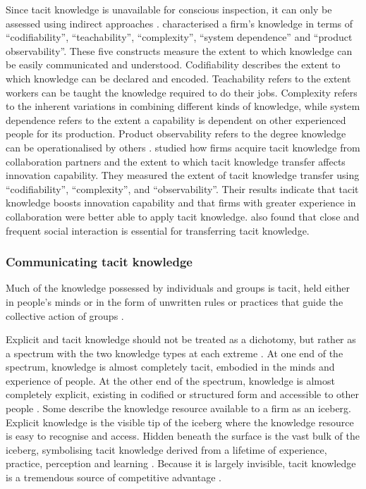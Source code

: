 Since tacit knowledge is unavailable for conscious inspection, it can only be assessed using indirect approaches \citep{chilton2007dimensions}. \citet{zander1995knowledge} characterised a firm's knowledge in terms of \enquote{codifiability}, \enquote{teachability}, \enquote{complexity}, \enquote{system dependence} and \enquote{product observability}. These five constructs measure the extent to which knowledge can be easily communicated and understood. Codifiability describes the extent to which knowledge can be declared and encoded. Teachability refers to the extent workers can be taught the knowledge required to do their jobs. Complexity refers to the inherent variations in combining different kinds of knowledge, while system dependence refers to the extent a capability is dependent on other experienced people for its production. Product observability refers to the degree knowledge can be operationalised by others \citep{winter1987knowledge,zander1995knowledge}. \citet{cavusgil2003tacit} studied how firms acquire tacit knowledge from collaboration partners and the extent to which tacit knowledge transfer affects innovation capability. They measured the extent of tacit knowledge transfer using \enquote{codifiability}, \enquote{complexity}, and \enquote{observability}. Their results indicate that tacit knowledge boosts innovation capability and that firms with greater experience in collaboration were better able to apply tacit knowledge. \citet{cavusgil2003tacit} also found that close and frequent social interaction is essential for transferring tacit knowledge.\medskip

\subsubsection{Communicating tacit knowledge}

Much of the knowledge possessed by individuals and groups is tacit, held either in people's minds or in the form of unwritten rules or practices that guide the collective action of groups \citep{mowery1996strategic,leonard1998role,burt2007secondhand,goksel2016can,lichtenthaler2016absorptive}. \medskip

Explicit and tacit knowledge should not be treated as a dichotomy, but rather as a spectrum with the two knowledge types at each extreme \citep{polanyi1966tacit,inkpen1998knowledge,cavusgil2003tacit}. At one end of the spectrum, knowledge is almost completely tacit, embodied in the minds and experience of people. At the other end of the spectrum, knowledge is almost completely explicit, existing in codified or structured form and accessible to other people \citep{leonard1998role}. Some describe the knowledge resource available to a firm as an iceberg. Explicit knowledge is the visible tip of the iceberg where the knowledge resource is easy to recognise and access. Hidden beneath the surface is the vast bulk of the iceberg, symbolising tacit knowledge derived from a lifetime of experience, practice, perception and learning \citep{haldin2000difficulties,mcadam2007exploring,rebernik2007fostering}. Because it is largely invisible, tacit knowledge is a tremendous source of competitive advantage \citep{nelson1982evolutionary,barney1991firm,grant1996toward,smith2001role,chilton2007dimensions,lu2015job}.\medskip

